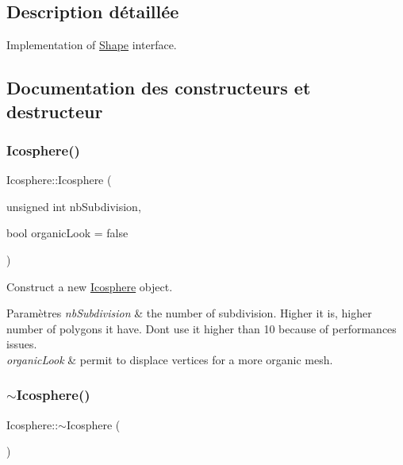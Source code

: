 \subsection{Description détaillée}
Implementation of \hyperlink{class_shape}{Shape} interface. 

\subsection{Documentation des constructeurs et destructeur}
\mbox{\label{class_icosphere_a6051bb79f73f5aecb95074118fb019b3}} 
\subsubsection{\texorpdfstring{Icosphere()}{Icosphere()}}
{\footnotesize\ttfamily Icosphere\+::\+Icosphere (\begin{DoxyParamCaption}\item[{unsigned int}]{nb\+Subdivision,  }\item[{bool}]{organic\+Look = {\ttfamily false} }\end{DoxyParamCaption})}



Construct a new \hyperlink{class_icosphere}{Icosphere} object. 


\begin{DoxyParams}{Paramètres}
{\em nb\+Subdivision} & the number of subdivision. Higher it is, higher number of polygons it have. Don\textquotesingle{}t use it higher than 10 because of performances issues. \\
\hline
{\em organic\+Look} & permit to displace vertices for a more organic mesh. \\
\hline
\end{DoxyParams}
\mbox{\label{class_icosphere_ac9473c8c8d6085b6370d95772b898a45}} 
\subsubsection{\texorpdfstring{$\sim$\+Icosphere()}{~Icosphere()}}
{\footnotesize\ttfamily Icosphere\+::$\sim$\+Icosphere (\begin{DoxyParamCaption}{ }\end{DoxyParamCaption})}



